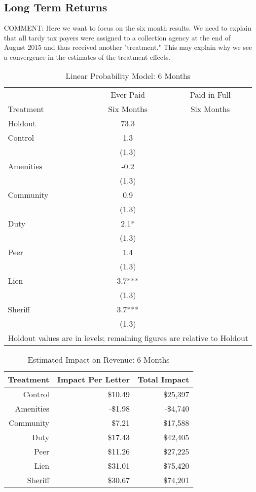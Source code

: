 \documentclass[12pt]{article}
\begin{document}
\newpage

\subsection{Long Term Returns}

COMMENT: Here we want to focus on the six month results. We need to explain that
all tardy tax payers were assigned to a collection agency at the end of August 2015 and
thus received another "treatment." This may explain why we see a convergence in the 
estimates of the treatment effects.

\begin{table}[htbp]
\centering
\caption{Linear Probability Model: 6 Months} \label{pc_rates_6}
\begin{tabular}{l c c}
  \hline
  & Ever Paid & Paid in Full \\
Treatment & Six Months & Six Months \\ 
 Holdout & 73.3 & \\ 
   \hline
Control & 1.3 & \\ 
   & (1.3) &  \\ 
  Amenities & -0.2 & \\ 
   & (1.3) \\ 
  Community & 0.9 &  \\ 
   & (1.3) & \\ 
  Duty & 2.1* &  \\ 
   & (1.3) & \\ 
  Peer & 1.4 & \\ 
   & (1.3) &  \\ 
  Lien & 3.7*** & \\ 
   & (1.3) & \\ 
  Sheriff & 3.7*** & \\ 
   & (1.3) & \\ 
 \hline 
 \multicolumn{3}{l}{\scriptsize{Holdout values are in levels; remaining figures are relative to Holdout}} \\ 
\end{tabular}
\end{table}


\begin{table}[htbp]
\centering
\caption{Estimated Impact on Revenue: 6 Months} \label{pc_rev_6}
\begin{tabular}{rrr}
  \hline
Treatment & Impact Per Letter & Total Impact \\ 
  \hline
Control & \$10.49 & \$25,397 \\ 
  Amenities & -\$1.98 & -\$4,740 \\ 
  Community & \$7.21 & \$17,588 \\ 
  Duty & \$17.43 & \$42,405 \\ 
  Peer & \$11.26 & \$27,225 \\ 
  Lien & \$31.01 & \$75,420 \\ 
  Sheriff & \$30.67 & \$74,201 \\ 
   \hline
\end{tabular}
\end{table}
\end{document}
